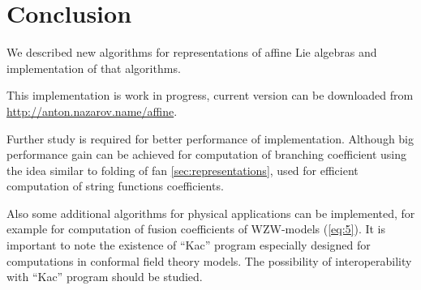\documentclass[a4paper,12pt]{article}
\theoremstyle{definition} \newtheorem{Def}{Definition}
\begin{document}
\section{Conclusion}
\label{sec:conclusion}
We described new algorithms for representations of affine Lie algebras
and implementation of that algorithms. 

This implementation is work in progress, current version can be
downloaded from \url{http://anton.nazarov.name/affine}.

Further study is required for better performance of implementation.
Although big performance gain can be achieved for computation of
branching coefficient using the idea similar to folding of fan
\ref{sec:representations}, used
for efficient computation of string functions coefficients.

Also some additional algorithms for physical applications can be
implemented, for example for computation of fusion coefficients of
WZW-models (\ref{eq:5}). It is important to note the existence of ``Kac''
program \cite{Fuchs:1996dd} especially designed for computations in conformal field theory
models. The possibility of interoperability with ``Kac'' program
should be studied.  

{}

\end{document}
